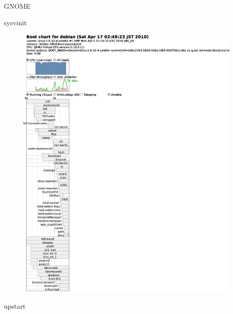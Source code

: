 \begin{frame}{GNOME}
\begin{minipage}[t]{0.48\hsize}
sysvinit
\begin{figure}[h]
\begin{center}
\includegraphics[width=1.0\hsize]{image201004/upstart/sysvinit-desktop-bootchart.eps}
\end{center}
\end{figure}
\end{minipage}
\begin{minipage}[t]{0.48\hsize}
upstart
\begin{figure}[h]
\begin{center}

\end{center}
\end{figure}
\end{minipage}
\end{frame}
